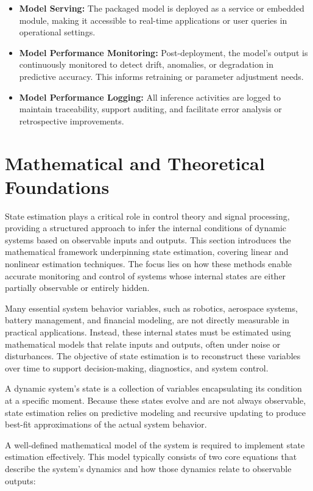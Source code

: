 \begin{itemize}
    \item \textbf{Model Serving:} The packaged model is deployed as a service or embedded module, making it accessible to real-time applications or user queries in operational settings.
    
    \item \textbf{Model Performance Monitoring:} Post-deployment, the model's output is continuously monitored to detect drift, anomalies, or degradation in predictive accuracy. This informs retraining or parameter adjustment needs.
    
    \item \textbf{Model Performance Logging:} All inference activities are logged to maintain traceability, support auditing, and facilitate error analysis or retrospective improvements.
\end{itemize}

\section{Mathematical and Theoretical Foundations}

State estimation plays a critical role in control theory and signal processing, providing a structured approach to infer the internal conditions of dynamic systems based on observable inputs and outputs. This section introduces the mathematical framework underpinning state estimation, covering linear and nonlinear estimation techniques. The focus lies on how these methods enable accurate monitoring and control of systems whose internal states are either partially observable or entirely hidden.

Many essential system behavior variables, such as robotics, aerospace systems, battery management, and financial modeling, are not directly measurable in practical applications. Instead, these internal states must be estimated using mathematical models that relate inputs and outputs, often under noise or disturbances. The objective of state estimation is to reconstruct these variables over time to support decision-making, diagnostics, and system control.

A dynamic system’s state is a collection of variables encapsulating its condition at a specific moment. Because these states evolve and are not always observable, state estimation relies on predictive modeling and recursive updating to produce best-fit approximations of the actual system behavior.

A well-defined mathematical model of the system is required to implement state estimation effectively. This model typically consists of two core equations that describe the system's dynamics and how those dynamics relate to observable outputs:

